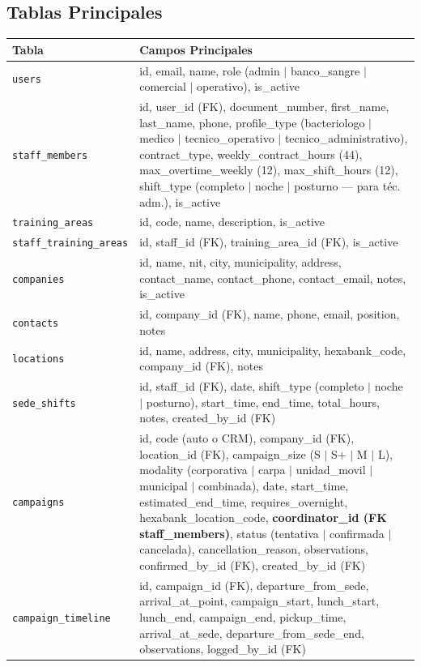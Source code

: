 \documentclass[10pt,a4paper]{article}
\begin{document}
\subsection{Tablas Principales}

\begin{longtable}{|p{4.2cm}|p{10.3cm}|}
\hline
\textbf{Tabla} & \textbf{Campos Principales} \\
\hline
\endhead
\texttt{users} & id, email, name, role (admin $|$ banco\_sangre $|$ comercial $|$ operativo), is\_active \\
\hline
\texttt{staff\_members} & id, user\_id (FK), document\_number, first\_name, last\_name, phone, profile\_type (bacteriologo $|$ medico $|$ tecnico\_operativo $|$ tecnico\_administrativo), contract\_type, weekly\_contract\_hours (44), max\_overtime\_weekly (12), max\_shift\_hours (12), shift\_type (completo $|$ noche $|$ posturno --- para t\'{e}c. adm.), is\_active \\
\hline
\texttt{training\_areas} & id, code, name, description, is\_active \\
\hline
\texttt{staff\_training\_areas} & id, staff\_id (FK), training\_area\_id (FK), is\_active \\
\hline
\texttt{companies} & id, name, nit, city, municipality, address, contact\_name, contact\_phone, contact\_email, notes, is\_active \\
\hline
\texttt{contacts} & id, company\_id (FK), name, phone, email, position, notes \\
\hline
\texttt{locations} & id, name, address, city, municipality, hexabank\_code, company\_id (FK), notes \\
\hline
\texttt{sede\_shifts} & id, staff\_id (FK), date, shift\_type (completo $|$ noche $|$ posturno), start\_time, end\_time, total\_hours, notes, created\_by\_id (FK) \\
\hline
\texttt{campaigns} & id, code (auto o CRM), company\_id (FK), location\_id (FK), campaign\_size (S $|$ S+ $|$ M $|$ L), modality (corporativa $|$ carpa $|$ unidad\_movil $|$ municipal $|$ combinada), date, start\_time, estimated\_end\_time, requires\_overnight, hexabank\_location\_code, \textbf{coordinator\_id (FK staff\_members)}, status (tentativa $|$ confirmada $|$ cancelada), cancellation\_reason, observations, confirmed\_by\_id (FK), created\_by\_id (FK) \\
\hline
\texttt{campaign\_timeline} & id, campaign\_id (FK), departure\_from\_sede, arrival\_at\_point, campaign\_start, lunch\_start, lunch\_end, campaign\_end, pickup\_time, arrival\_at\_sede, departure\_from\_sede\_end, observations, logged\_by\_id (FK) \\

\end{longtable}
\end{document}
